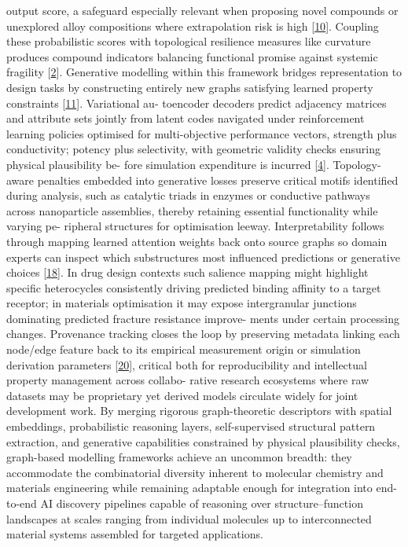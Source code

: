\documentclass[
]{article}
\begin{document}
output score, a safeguard especially relevant when proposing novel
compounds or unexplored alloy compositions where extrapolation risk is
high {[}\hyperref[_bookmark50]{10}{]}. Coupling these probabilistic
scores with topological resilience measures like curvature produces
compound indicators balancing functional promise against systemic
fragility {[}\hyperref[_bookmark42]{2}{]}. Generative modelling within
this framework bridges representation to design tasks by constructing
entirely new graphs satisfying learned property constraints
{[}\hyperref[_bookmark51]{11}{]}. Variational au- toencoder decoders
predict adjacency matrices and attribute sets jointly from latent codes
navigated under reinforcement learning policies optimised for
multi-objective performance vectors, strength plus conductivity; potency
plus selectivity, with geometric validity checks ensuring physical
plausibility be- fore simulation expenditure is incurred
{[}\hyperref[_bookmark44]{4}{]}. Topology-aware penalties embedded into
generative losses preserve critical motifs identified during analysis,
such as catalytic triads in enzymes or conductive pathways across
nanoparticle assemblies, thereby retaining essential functionality while
varying pe- ripheral structures for optimisation leeway.
Interpretability follows through mapping learned attention weights back
onto source graphs so domain experts can inspect which substructures
most influenced predictions or generative choices
{[}\hyperref[_bookmark58]{18}{]}. In drug design contexts such salience
mapping might highlight specific heterocycles consistently driving
predicted binding affinity to a target receptor; in materials
optimisation it may expose intergranular junctions dominating predicted
fracture resistance improve- ments under certain processing changes.
Provenance tracking closes the loop by preserving metadata linking each
node/edge feature back to its empirical measurement origin or simulation
derivation parameters {[}\hyperref[_bookmark60]{20}{]}, critical both
for reproducibility and intellectual property management across collabo-
rative research ecosystems where raw datasets may be proprietary yet
derived models circulate widely for joint development work. By merging
rigorous graph-theoretic descriptors with spatial embeddings,
probabilistic reasoning layers, self-supervised structural pattern
extraction, and generative capabilities constrained by physical
plausibility checks, graph-based modelling frameworks achieve an
uncommon breadth: they accommodate the combinatorial diversity inherent
to molecular chemistry and materials engineering while remaining
adaptable enough for integration into end-to-end AI discovery pipelines
capable of reasoning over structure--function landscapes at scales
ranging from individual molecules up to interconnected material systems
assembled for targeted applications.
\end{document}
